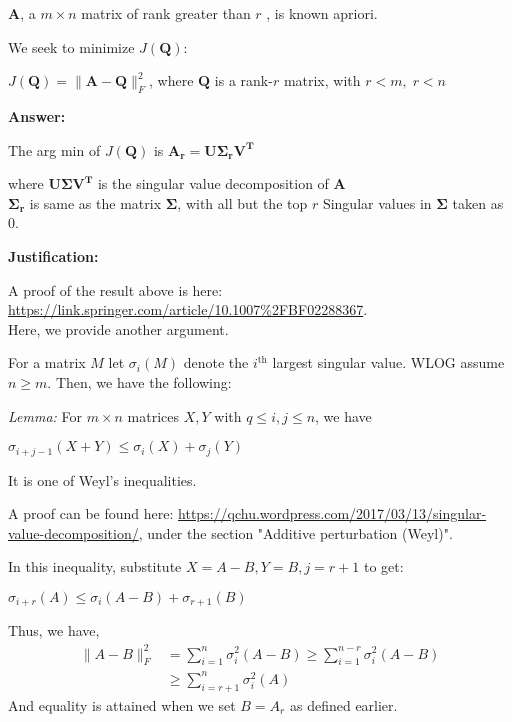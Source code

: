 \documentclass[fleqn, 11pt]{article}
\newcommand{\bs}[1]{\boldsymbol{#1}}
\begin{document}
\smallskip

$\bs{A}$, a $m \times n$ matrix of rank greater than $r$ , is known apriori.

\smallskip

We seek to minimize $J(\bs{Q})$:
\begin{center}
    $J(\bs{Q}) = \|\bs{A}-\bs{Q}\|^2_F$, where $\bs{Q}$ is a rank-$r$ matrix, with $r < m, \; r < n$
\end{center}
\hrulefill

\medskip

\textbf{Answer: }

\medskip

The arg min of $J(\bs{Q})$ is $\bs{A_r=U \Sigma_r V^T}$ 

\smallskip

where $\bs{U \Sigma V^T}$ is the singular value decomposition of $\bs{A}$ \\
$\bs{\Sigma_r} $ is same as the matrix
$\bs{\Sigma} $, with all but the top $r$ Singular values in $\bs{\Sigma}$ taken as 0.

\hrulefill

\medskip

\textbf{Justification: }

A proof of the result above is here: \url{https://link.springer.com/article/10.1007\%2FBF02288367}. \\
Here, we provide another argument.

\medskip

For a matrix $M$ let $\sigma_i(M)$ denote the $i^{\text{th}}$ largest singular value.
WLOG assume $n \geq  m$.
Then, we have the following: 

\textit{Lemma: } For $m \times n$ matrices $X,Y$ with $q \leq i, j \leq n$, 
we have
\begin{center}
   $ \sigma_{i+j - 1}(X + Y) \leq \sigma_i(X) + \sigma_j(Y) $
\end{center}

It is one of Weyl's inequalities. 

A proof can be found here: \url{https://qchu.wordpress.com/2017/03/13/singular-value-decomposition/}, 
under the section "Additive perturbation (Weyl)". 

In this inequality, substitute $X = A-B, Y = B, j = r+1$ to get:
\begin{center}
    $\sigma_{i+r}(A) \leq \sigma _{i}(A - B) + \sigma_{r+1}(B)$
\end{center}
Thus, we have,
    \begin{align*}
\|A - B\|_F^2 &= 
\sum_{i=1}^n \sigma_i^2(A - B) \geq 
\sum_{i=1}^{n-r} \sigma_i^2(A - B)
\\ & \geq \sum_{i=r+1}^{n} \sigma_i^2(A)
\end{align*}
And equality is attained when we set $B=A_r$ as defined earlier. 
\end{document}
